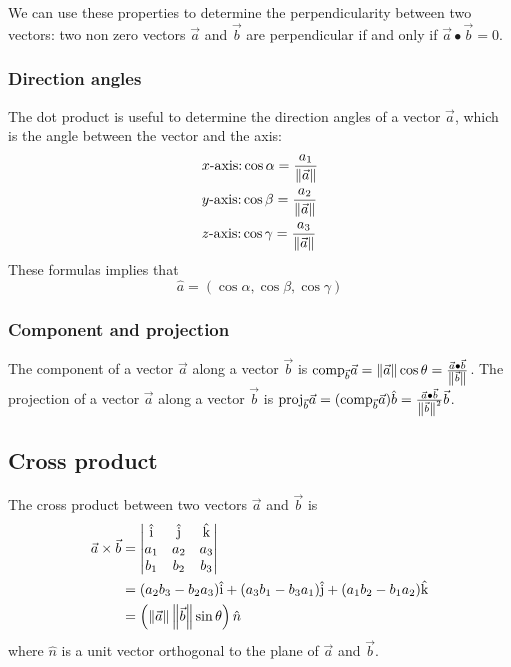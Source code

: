 \documentclass[10pt, twocolumn]{article}
\theoremstyle{remark}
\begin{document}
We can use these properties to determine the perpendicularity between two vectors: two non zero vectors \(\vec{a}\) and \(\vec{b}\) are perpendicular if and only if \(\vec{a} \bullet \vec{b} = 0\).

\subsubsection*{Direction angles}
The dot product is useful to determine the direction angles of a vector \(\vec{a}\), which is the angle between the vector and the axis:
\begin{align*}
   & x\text{-axis:} \cos\alpha = \frac{a_1 }{\normvec{a}} \\
   & y\text{-axis:} \cos\beta = \frac{a_2 }{\normvec{a}}  \\
   & z\text{-axis:} \cos\gamma = \frac{a_3 }{\normvec{a}}
\end{align*}
These formulas implies that
\[
  \hat{a} = (\cos\alpha, \cos\beta, \cos\gamma)
\]
\subsubsection*{Component and projection}
The component of a vector \(\vec{a}\) along a vector \(\vec{b}\) is \(\comp{a}{b} = \normvec{a}\cos\theta = \frac{\vec{a} \bullet \vec{b}}{\normvec{b}}\).
The projection of a vector \(\vec{a}\) along a vector \(\vec{b}\) is \(\proj{a}{b} = (\comp{a}{b})\hat{b} = \frac{\vec{a} \bullet \vec{b}}{\normvec{b}^2 }\vec{b}\).

\subsection{Cross product}
The cross product between two vectors \(\vec{a}\) and \(\vec{b}\) is
\begin{align*}
  \vec{a} \times \vec{b} & =
  \begin{vmatrix}
    \ivec & \jvec & \kvec \\
    a_1   & a_2   & a_3   \\
    b_1   & b_2   & b_3
  \end{vmatrix}                                                                                       \\
                         & = (a_2 b_3 - b_2 a_3 )\ivec + (a_3 b_1 - b_3 a_1 )\jvec + (a_1 b_2 - b_1 a_2 )\kvec \\
                         & = \left( \normvec{a}\normvec{b}\sin\theta \right)\hat{n}
\end{align*}
where \(\hat{n}\) is a unit vector orthogonal to the plane of \(\vec{a}\) and \(\vec{b}\).
\end{document}
